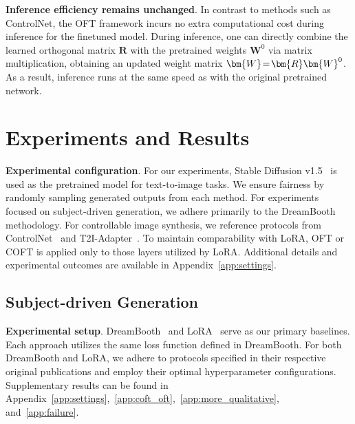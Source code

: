 \textbf{Inference efficiency remains unchanged}. In contrast to methods such as ControlNet, the OFT framework incurs no extra computational cost during inference for the finetuned model. During inference, one can directly combine the learned orthogonal matrix $\bm{R}$ with the pretrained weights $\bm{W}^0$ via matrix multiplication, obtaining an updated weight matrix $\thickmuskip=2mu \medmuskip=2mu \bm{W}=\bm{R}\bm{W}^0$. As a result, inference runs at the same speed as with the original pretrained network.

\section{Experiments and Results}

\textbf{Experimental configuration}. For our experiments, Stable Diffusion v1.5~\cite{rombach2022high} is used as the pretrained model for text-to-image tasks. We ensure fairness by randomly sampling generated outputs from each method. For experiments focused on subject-driven generation, we adhere primarily to the DreamBooth~\cite{ruiz2023dreambooth} methodology. For controllable image synthesis, we reference protocols from ControlNet~\cite{zhang2023adding} and T2I-Adapter~\cite{mou2023t2i}. To maintain comparability with LoRA, OFT or COFT is applied only to those layers utilized by LoRA. Additional details and experimental outcomes are available in Appendix~\ref{app:settings}.

\subsection{Subject-driven Generation}

\textbf{Experimental setup}. DreamBooth~\cite{ruiz2023dreambooth} and LoRA~\cite{hulora2022} serve as our primary baselines. Each approach utilizes the same loss function defined in DreamBooth. For both DreamBooth and LoRA, we adhere to protocols specified in their respective original publications and employ their optimal hyperparameter configurations. Supplementary results can be found in Appendix~\ref{app:settings},~\ref{app:coft_oft},~\ref{app:more_qualitative}, and~\ref{app:failure}.

